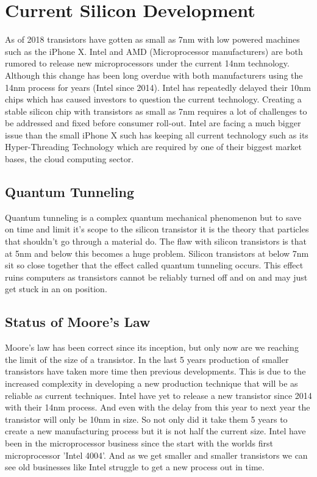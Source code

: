 \documentclass[journal]{IEEEtran}
\begin{document}
\section{Current Silicon Development}
As of 2018 transistors have gotten as small as 7nm with low powered machines such as the iPhone X. Intel and AMD (Microprocessor manufacturers) are both rumored to release new microprocessors under the current 14nm technology. Although this change has been long overdue with both manufacturers using the 14nm process for years (Intel since 2014). Intel has repeatedly delayed their 10nm chips \cite{dent_2018} which has caused investors to question the current technology. Creating a stable silicon chip with transistors as small as 7nm requires a lot of challenges to be addressed and fixed before consumer roll-out. Intel are facing a much bigger issue than the small iPhone X such has keeping all current technology such as its Hyper-Threading Technology which are required by one of their biggest market bases, the cloud computing sector. 

\subsection{Quantum Tunneling}
Quantum tunneling is a complex quantum mechanical phenomenon \cite{70394920140101} but to save on time and limit it's scope to the silicon transistor it is the theory that particles that shouldn't go through a material do. The flaw with silicon transistors is that at 5nm and below this becomes a huge problem. Silicon transistors at below 7nm sit so close together that the effect called quantum tunneling occurs. This effect ruins computers as transistors cannot be reliably turned off and on and may just get stuck in an on position.

\subsection{Status of Moore's Law}
Moore's law has been correct since its inception, but only now are we reaching the limit of the size of a transistor. \cite{591665} In the last 5 years production of smaller transistors have taken more time then previous developments. This is due to the increased complexity in developing a new production technique that will be as reliable as current techniques. Intel have yet to release a new transistor since 2014 with their 14nm process. And even with the delay from this year to next year the transistor will only be 10nm in size. So not only did it take them 5 years to create a new manufacturing process but it is not half the current size. Intel have been in the microprocessor business since the start with the worlds first microprocessor 'Intel 4004'. And as we get smaller and smaller transistors we can see old businesses like Intel struggle to get a new process out in time.
\end{document}
